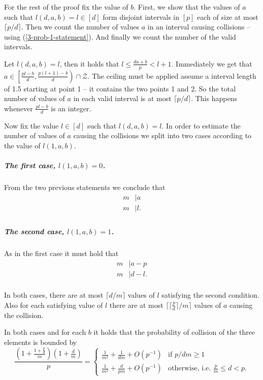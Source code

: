 \documentclass{article}
\begin{document}
For the rest of the proof fix the value of $b$. 
First, we show that the values of $a$ such that $l(d, a, b) = l \in [d]$ form disjoint intervals in $[p]$ each of size at most $\lceil p/d \rceil$.
Then we count the number of values $a$ in an interval causing collisions -- using (\ref{3-prob-1-statement}).
And finally we count the number of the valid intervals.

Let $l(d, a, b) = l$, then it holds that $l \leq \frac{da + b}{p} < l + 1$. Immediately we get that $a \in \left[\frac{pl - b}{d}, \frac{p(l + 1) - b}{d}\right) \cap \mathcal{Z}$. The ceiling must be applied assume a interval length of 1.5 starting at point 1 -- it contains the two points 1 and 2. So the total number of values of $a$ in each valid interval is at most $\lceil p / d \rceil$. This happens whenever $\frac{pl - b}{d}$ is an integer.

Now fix the value $l \in [d]$ such that $l(d, a, b) = l$.
In order to estimate the number of values of $a$ causing the collisions we split into two cases according to the value of $l(1, a, b)$.

\subparagraph{The first case, $l(1, a, b) = 0$.} 
From the two previous statements we conclude that
\begin{align*}
	m & \mid a \\
	m & \mid l. \\
\end{align*}

\subparagraph{The second case, $l(1, a, b) = 1$.}
As in the first case it must hold that
\begin{align*}
	m & \mid a - p \\
	m & \mid d - l. \\
\end{align*}

In both cases, there are at most $\lceil d/m \rceil$ values of $l$ satisfying the second condition.
Also for each satisfying value of $l$ there are at most $\lceil \lceil\frac{p}{d}\rceil / m \rceil$ values of $a$ causing the collision.

In both cases and for each $b$ it holds that the probability of collision of the three elements is bounded by
\[
\frac{\left(1 + \frac{1 + \frac{p}{d}}{m}\right)\left(1 + \frac{d}{m}\right)}{p} =
\begin{cases}
	\frac{1}{m^2} + \frac{1}{dm} + O\left(p^{-1}\right) & \mbox{if } p/dm \geq 1 \\
	\frac{1}{m^2} + \frac{d}{pm} + O\left(p^{-1}\right) & \mbox{otherwise, i.e. } \frac{p}{m} \leq d < p.
\end{cases}
\]
\end{document}
